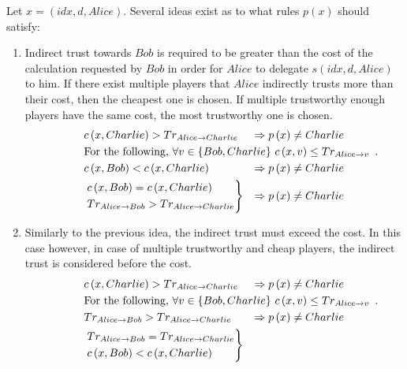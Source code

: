   Let $x = \left(idx, d, Alice\right)$. Several ideas exist as to what rules
  $p\left(x\right)$ should satisfy:
  \begin{enumerate}
    \item Indirect trust towards $Bob$ is required to be greater than the cost of the
    calculation requested by $Bob$ in order for $Alice$ to delegate $s\left(idx, d,
    Alice\right)$ to him. If there exist multiple players that $Alice$ indirectly trusts
    more than their cost, then the cheapest one is chosen. If multiple trustworthy enough
    players have the same cost, the most trustworthy one is chosen.
    \begin{align*}
      & c\left(x, Charlie\right) > Tr_{Alice \rightarrow Charlie} & \Rightarrow
      p\left(x\right) \neq Charlie \\
      \mathrlap{\mbox{For the following, } \forall v \in \{Bob, Charlie\} \ c\left(x,
      v\right) \leq Tr_{Alice \rightarrow v} \enspace.} \\
      & c\left(x, Bob\right) < c\left(x, Charlie\right) & \Rightarrow p\left(x\right) \neq
      Charlie \\
      &
      \begin{rcases}
        c\left(x, Bob\right) = c\left(x, Charlie\right) \\
        Tr_{Alice \rightarrow Bob} > Tr_{Alice \rightarrow Charlie}
      \end{rcases}
      & \Rightarrow p\left(x\right) \neq Charlie
    \end{align*}
    \item Similarly to the previous idea, the indirect trust must exceed the cost. In this
    case however, in case of multiple trustworthy and cheap players, the indirect trust is
    considered before the cost.
    \begin{align*}
      & c\left(x, Charlie\right) > Tr_{Alice \rightarrow Charlie} & \Rightarrow
      p\left(x\right) \neq Charlie \\
      \mathrlap{\mbox{For the following, } \forall v \in \{Bob, Charlie\} \ c\left(x,
      v\right) \leq Tr_{Alice \rightarrow v} \enspace.} \\
      & Tr_{Alice \rightarrow Bob} > Tr_{Alice \rightarrow Charlie} & \Rightarrow
      p\left(x\right) \neq Charlie \\
      &
      \begin{rcases}
        Tr_{Alice \rightarrow Bob} = Tr_{Alice \rightarrow Charlie} \\
        c\left(x, Bob\right) < c\left(x, Charlie\right)

\end{rcases}
\end{align*}
\end{enumerate}
